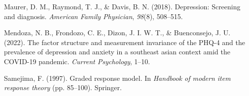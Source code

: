 \documentclass[
  man,floatsintext]{apa6}
\newlength{\cslhangindent}
\newlength{\cslentryspacingunit} %
\newenvironment{CSLReferences}[2] %
 {%
  \setlength{\parindent}{0pt}
  \ifodd #1
  \let\oldpar\par
  \def\par{\hangindent=\cslhangindent\oldpar}
  \fi
  \setlength{\parskip}{#2\cslentryspacingunit}
 }%
 {}
\begin{document}
\begin{CSLReferences}{1}{0}
\leavevmode{}%
Maurer, D. M., Raymond, T. J., \& Davis, B. N. (2018). Depression: Screening and diagnosis. \emph{American Family Physician}, \emph{98}(8), 508--515.

\leavevmode{}%
Mendoza, N. B., Frondozo, C. E., Dizon, J. I. W. T., \& Buenconsejo, J. U. (2022). The factor structure and measurement invariance of the PHQ-4 and the prevalence of depression and anxiety in a southeast asian context amid the COVID-19 pandemic. \emph{Current Psychology}, 1--10.

\leavevmode{}%
Samejima, F. (1997). Graded response model. In \emph{Handbook of modern item response theory} (pp. 85--100). Springer.

\end{CSLReferences}


\clearpage
\renewcommand{\listfigurename}{Figure captions}
\end{document}
